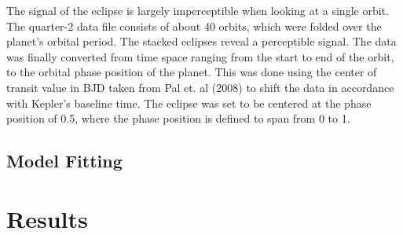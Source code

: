 \documentclass[manuscript]{aastex}
\begin{document}
    The signal of the eclipse is largely imperceptible when looking at a single orbit. The quarter-2 data file consists of about 40 orbits, which were folded over the planet's orbital period. The stacked eclipses reveal a perceptible signal. The data was finally converted from time space ranging from the start to end of the orbit, to the orbital phase position of the planet. This was done using the center of transit value in BJD taken from Pal et. al (2008) to shift the data in accordance with Kepler's baseline time. The eclipse was set to be centered at the phase position of 0.5, where the phase position is defined to span from 0 to 1. 

\subsection{Model Fitting}




\section{Results}


\end{document}
